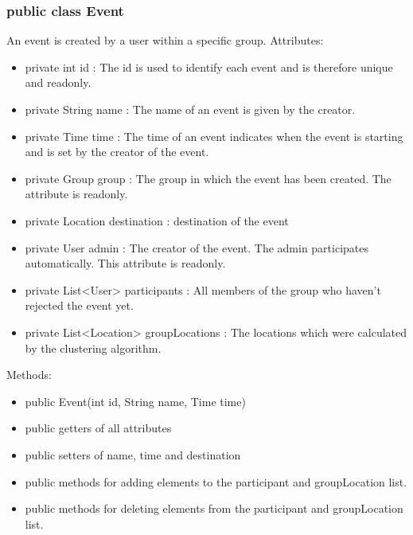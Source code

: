 	\subsubsection{public class Event}
	An event is created by a user within a specific group.
	\newline Attributes:
	\begin{itemize}
	\item private  int id : The id is used to identify each event and is therefore unique and readonly.
	\item private String name : The name of an event is given by the creator.
	\item private Time time : The time of an event indicates when the event is starting and is set by the creator of the event.
	\item private Group group : The group in which the event has been created. The attribute is readonly.
	\item private Location destination : destination of the event
	\item private User admin : The creator of the event. The admin participates automatically. This attribute is readonly.
	\item private List<User> participants : All members of the group who haven't rejected the event yet.
	\item private List<Location> groupLocations : The locations which were calculated by the clustering algorithm.
	\end{itemize}
	Methods:
	\begin{itemize}
	\item public Event(int id, String name, Time time)
	\item public getters of all attributes
	\item public setters of name, time and destination
	\item public methods for adding elements to the participant and groupLocation list.
	\item public methods for deleting elements from the participant and groupLocation list.
	\end{itemize}

